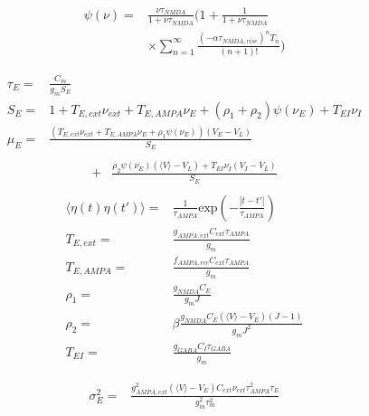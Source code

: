


\begin{align*}
    \psi(\nu) =& \frac {\nu \tau _{NMDA}}{1+ \nu \tau_{NMDA}}\bigg( 1+ \frac {1}{1+ \nu \tau_{NMDA}}\\
    &\times \sum_{n=1}^{\infty}\frac {(-\alpha \tau_{NMDA,rise})^nT_n}{(n+1)!} \bigg)
\end{align*}


\begin{align*}
    \tau_E =& \frac {C_m}{g_m S_E}\\
    S_E =& 1 + T_{E,ext}\nu_{ext} + T_{E,AMPA}\nu_E +(\rho _1 + \rho_2)\psi(\nu_E) + T_{EI}\nu_I\\
    \mu_E =& \frac{(T_{E,ext}\nu_{ext} + T_{E,AMPA}\nu_E + \rho_1\psi(\nu_E))(V_E - V_L)}{S_E}\\
\end{align*}
\begin{align*}
     +& \frac{\rho_2\psi(\nu_E)(\langle V \rangle - V_L) + T_{EI}\nu_I(V_I - V_L)}{S_E}\\
\end{align*}
\begin{align*}
    \langle\eta(t)\eta(t')\rangle =& \frac{1}{\tau_{AMPA}}\text{exp} \left( - \frac{|t-t'|}{\tau_{AMPA}} \right)\\
    T_{E,ext} =& \frac{g_{AMPA,ext}C_{ext}\tau_{AMPA}}{g_m}\\
    T_{E,AMPA} =& \frac{f_{AMPA,rec}C_{ext}\tau_{AMPA}}{g_m}\\
    \rho_1 =& \frac {g_{NMDA}C_{E}}{g_mJ}\\
    \rho_2 =& \beta \frac{g_{NMDA}C_E(\langle V \rangle - V_E) (J-1)}{g_mJ^2}\\
    T_{EI} =& \frac {g_{GABA}C_I \tau_{GABA}}{g_m}
\end{align*}

\begin{align*}
    \sigma_E^2 =& \frac{g_{AMPA,ext}^2 (\langle V
    \rangle-V_E)C_{ext}\nu_{ext}\tau_{AMPA}^2\tau_E}{g_m^2\tau_m^2}
\end{align*}



